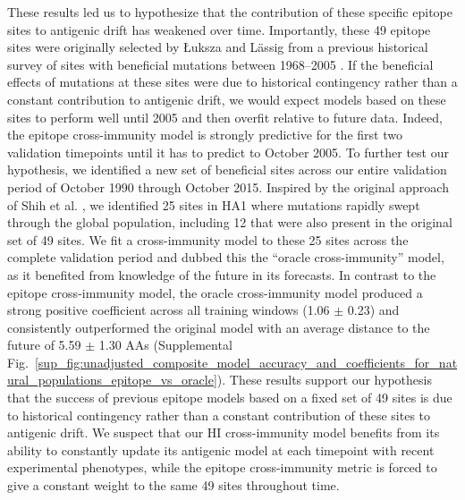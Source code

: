 These results led us to hypothesize that the contribution of these specific epitope sites to antigenic drift has weakened over time.
Importantly, these 49 epitope sites were originally selected by {\L}uksza and L\"assig \cite{Luksza:2014hj} from a previous historical survey of sites with beneficial mutations between 1968--2005 \cite{Shih:2007bd}.
If the beneficial effects of mutations at these sites were due to historical contingency rather than a constant contribution to antigenic drift, we would expect models based on these sites to perform well until 2005 and then overfit relative to future data.
Indeed, the epitope cross-immunity model is strongly predictive for the first two validation timepoints until it has to predict to October 2005.
To further test our hypothesis, we identified a new set of beneficial sites across our entire validation period of October 1990 through October 2015.
Inspired by the original approach of Shih et al. \cite{Shih:2007bd}, we identified 25 sites in HA1 where mutations rapidly swept through the global population, including 12 that were also present in the original set of 49 sites.
We fit a cross-immunity model to these 25 sites across the complete validation period and dubbed this the ``oracle cross-immunity'' model, as it benefited from knowledge of the future in its forecasts.
In contrast to the epitope cross-immunity model, the oracle cross-immunity model produced a strong positive coefficient across all training windows (1.06 $\pm$ 0.23) and consistently outperformed the original model with an average distance to the future of 5.59 $\pm$ 1.30 AAs (Supplemental Fig.~\ref{sup_fig:unadjusted_composite_model_accuracy_and_coefficients_for_natural_populations_epitope_vs_oracle}).
These results support our hypothesis that the success of previous epitope models based on a fixed set of 49 sites is due to historical contingency rather than a constant contribution of these sites to antigenic drift.
We suspect that our HI cross-immunity model benefits from its ability to constantly update its antigenic model at each timepoint with recent experimental phenotypes, while the epitope cross-immunity metric is forced to give a constant weight to the same 49 sites throughout time.

